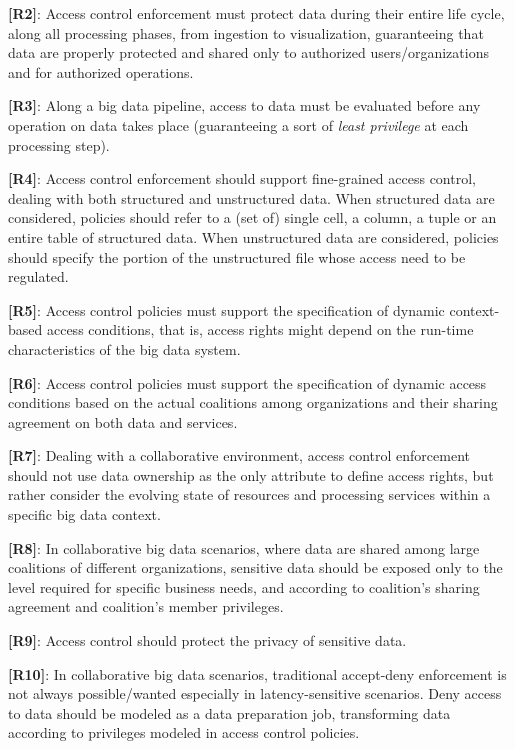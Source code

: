 \noindent \textbf{[R2]}: Access control enforcement must protect data during their entire life cycle, along all processing phases, from ingestion to visualization, guaranteeing that data are properly protected and shared only to authorized users/organizations and for authorized operations.

\noindent  \textbf{[R3]}: Along a big data pipeline, access to data must be evaluated before any operation on data takes place (guaranteeing a sort of \emph{least privilege} at each processing step).

\noindent \textbf{[R4]}: Access control enforcement should support fine-grained access control, dealing with both structured and unstructured data. When structured data are considered, policies should refer to a (set of) single cell, a column, a tuple or an entire table of structured data. When unstructured data are considered, policies should specify the portion of the unstructured file whose access need to be regulated.

\noindent  \textbf{[R5]}: Access control policies must support the specification of dynamic context-based access conditions, that is, access rights might depend on the run-time characteristics of the big data system.

\noindent  \textbf{[R6]}: Access control policies must support the specification of dynamic access conditions based on the actual coalitions among organizations and their sharing agreement on both data and services.

\noindent  \textbf{[R7]}: Dealing with a collaborative environment, access control enforcement should not use data ownership as the only attribute to define access rights, but rather consider the evolving state of resources and processing services within a specific big data context. 

\noindent  \textbf{[R8]}: In collaborative big data scenarios, where data are shared among large coalitions of different organizations, sensitive data should be exposed only to the level required for specific business needs, and according to coalition's sharing agreement and coalition's member privileges.

\noindent  \textbf{[R9]}: Access control should protect the privacy of sensitive data.

\noindent  \textbf{[R10]}: In collaborative big data scenarios, traditional accept-deny enforcement is not always possible/wanted especially in latency-sensitive scenarios. Deny access to data should be modeled as a data preparation job, transforming data according to privileges modeled in access control policies. %


